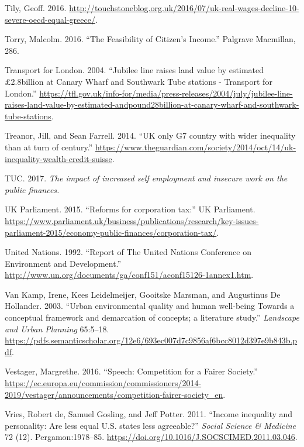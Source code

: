 \documentclass[]{tufte-handout}
\begin{document}
\leavevmode\hypertarget{ref-Tily2016}{}%
Tily, Geoff. 2016.
\url{http://touchstoneblog.org.uk/2016/07/uk-real-wages-decline-10-severe-oecd-equal-greece/}.

\leavevmode\hypertarget{ref-Torry2016}{}%
Torry, Malcolm. 2016. ``The Feasibility of Citizen's Income.'' Palgrave
Macmillan, 286.

\leavevmode\hypertarget{ref-TransportforLondon2004}{}%
Transport for London. 2004. ``Jubilee line raises land value by
estimated £2.8billion at Canary Wharf and Southwark Tube stations -
Transport for London.''
\url{https://tfl.gov.uk/info-for/media/press-releases/2004/july/jubilee-line-raises-land-value-by-estimated-andpound28billion-at-canary-wharf-and-southwark-tube-stations}.

\leavevmode\hypertarget{ref-TreanorFarrell2014}{}%
Treanor, Jill, and Sean Farrell. 2014. ``UK only G7 country with wider
inequality than at turn of century.''
\url{https://www.theguardian.com/society/2014/oct/14/uk-inequality-wealth-credit-suisse}.

\leavevmode\hypertarget{ref-TUC2017}{}%
TUC. 2017. \emph{The impact of increased self employment and insecure
work on the public finances.}

\leavevmode\hypertarget{ref-UKParliament2015}{}%
UK Parliament. 2015. ``Reforms for corporation tax:'' UK Parliament.
\url{https://www.parliament.uk/business/publications/research/key-issues-parliament-2015/economy-public-finances/corporation-tax/}.

\leavevmode\hypertarget{ref-UnitedNations1992}{}%
United Nations. 1992. ``Report of The United Nations Conference on
Environment and Development.''
\url{http://www.un.org/documents/ga/conf151/aconf15126-1annex1.htm}.

\leavevmode\hypertarget{ref-VanKamp2003}{}%
Van Kamp, Irene, Kees Leidelmeijer, Gooitske Marsman, and Augustinus De
Hollander. 2003. ``Urban environmental quality and human well-being
Towards a conceptual framework and demarcation of concepts; a literature
study.'' \emph{Landscape and Urban Planning} 65:5--18.
\url{https://pdfs.semanticscholar.org/12e6/693ec007d7c9856af6bcc8012d397e9b843b.pdf}.

\leavevmode\hypertarget{ref-Vestager2016}{}%
Vestager, Margrethe. 2016. ``Speech: Competition for a Fairer Society.''
\url{https://ec.europa.eu/commission/commissioners/2014-2019/vestager/announcements/competition-fairer-society_en}.

\leavevmode\hypertarget{ref-DeVries2011}{}%
Vries, Robert de, Samuel Gosling, and Jeff Potter. 2011. ``Income
inequality and personality: Are less equal U.S. states less agreeable?''
\emph{Social Science \& Medicine} 72 (12). Pergamon:1978--85.
\url{https://doi.org/10.1016/J.SOCSCIMED.2011.03.046}.
\end{document}
